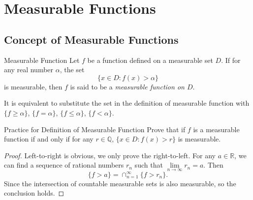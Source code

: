 

\section{Measurable Functions}

\subsection{Concept of Measurable Functions}

\begin{definition}{Measurable Function}{}
  Let $f$ be a function defined on a measurable set $D$.
  If for any real number $\alpha$, the set
  \begin{equation}
    \{x \in D: f(x) > \alpha\}
  \end{equation}
  is measurable, then $f$ is said to be a \emph{measurable function on $D$}.
\end{definition}

\begin{note}
  It is equivalent to substitute the set in the definition of measurable function with
  $\{f \geq \alpha\}$, $\{f = \alpha\}$, $\{f \leq \alpha\}$, $\{f < \alpha\}$.
\end{note}

\begin{example}{Practice for Definition of Measurable Function}{}
  Prove that if $f$ is a measurable function if and only if for any $r \in
    \mathbb{Q}$, $\{x \in D: f(x) > r\}$ is measurable.
\end{example}

\begin{proof}
  Left-to-right is obvious, we only prove the right-to-left.
  For any $a \in \mathbb{R}$, we can find a sequence of rational numbers $r_n$
  such that $\lim \limits _{n \rightarrow \infty} r_n = a$.
  Then
  \begin{equation}
    \{f > a\} = \cap _{n=1}^{\infty} \{f > r_n\}.
  \end{equation}
  Since the intersection of countable measurable sets is also measurable,
  so the conclusion holds.
\end{proof}

